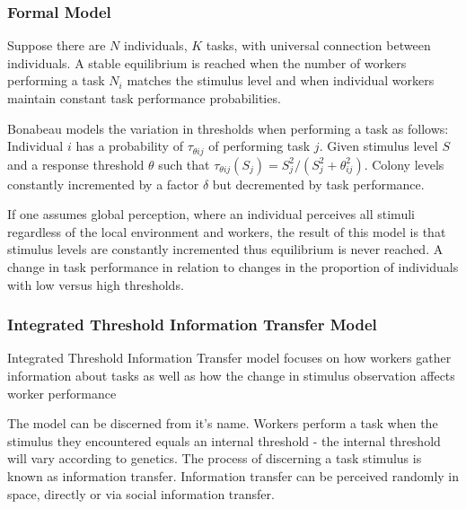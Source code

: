 \subsubsection{Formal Model}
Suppose there are $N$ individuals, $K$ tasks, with universal connection between individuals. 
A stable equilibrium is reached when the number of workers performing a task $N_i$ matches the stimulus level and when individual workers maintain constant task performance probabilities. \cite{page1990self}

Bonabeau models the variation in thresholds when performing a task as follows: Individual $i$ has a probability of $\tau_{\theta ij}$ of performing task $j$. Given stimulus level $S$ and a response threshold $\theta$ such that $\tau_{\theta ij}(S_j) = S_j^2/(S_j^2 + \theta_{ij}^2)$. Colony levels constantly incremented by a factor $\delta$ but decremented by task performance.

If one assumes global perception, where an individual perceives all stimuli regardless of the local environment and workers, the result of this model is that stimulus levels are constantly incremented thus equilibrium is never reached. A change in task performance in relation to changes in the proportion of individuals with low versus high thresholds. %





\subsubsection{Integrated Threshold Information Transfer Model}
Integrated Threshold Information Transfer model \cite{fewell1999division} focuses on how workers gather information about tasks as well as how the change in stimulus observation affects worker performance %

The model can be discerned from it's name. Workers perform a task when the stimulus they encountered equals an internal threshold - the internal threshold will vary according to genetics. The process of discerning a task stimulus is known as information transfer. Information transfer can be perceived randomly in space, directly or via social information transfer.

